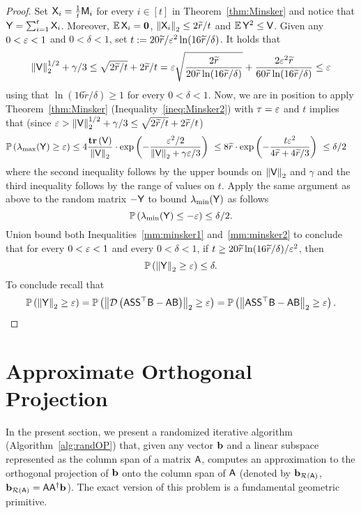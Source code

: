 \begin{proof}
Set ${\mathsf{X} }_i = \frac1{t} {\mathsf{M} }_i$ for every $i\in{[t]}$ in Theorem~\ref{thm:Minsker} and notice that ${\mathsf{Y} } = \sum_{i=1}^{t}{\mathsf{X} }_i$. Moreover, $\operatorname{\mathbb{E}} {\mathsf{X} }_i =\mathbf{0}$, $\left\|{\mathsf{X} }_i\right\|_2\leq 2\widetilde{r} / t$ and $\operatorname{\mathbb{E}} {\mathsf{Y} }^2 \leq {\ensuremath{\mathsf{V} }}$. Given any $0<\varepsilon < 1$ and $0<\delta <1$, set $t := 20 \widetilde{r} /\varepsilon^2 \ln( 16\widetilde{r}/\delta)$. It holds that
\[
\left\|{\mathsf{V} }\right\|_2^{1/2} + \gamma /3 \leq \sqrt{2\widetilde{r} /t} + 2\widetilde{r}/t  = \varepsilon \sqrt{\frac{2\widetilde{r}}{20\widetilde{r}\ln(16\widetilde{r}/\delta)}} + \frac{2\varepsilon^2 \widetilde{r}}{60\widetilde{r}\ln(16\widetilde{r}/\delta)} \leq \varepsilon
\]
using that $\ln(16\widetilde{r}/\delta) \geq 1$ for every $0<\delta < 1$. Now, we are in position to apply Theorem~\ref{thm:Minsker} (Inequality~\ref{ineq:Minsker2}) with $\tau=\varepsilon$ and $t$ implies that (since $\varepsilon > \left\|{\mathsf{V} }\right\|_2^{1/2} + \gamma /3 \leq \sqrt{2\widetilde{r} /t} + 2\widetilde{r}/t$)
\begin{align}
\mathbb{P}\left( \lambda_{\max}({\mathsf{Y} }) \geq \varepsilon \right) &\leq 4 \frac{\operatorname{\textbf{tr}}\left({\mathsf{V} }\right)}{\left\|{\mathsf{V} }\right\|_2} \cdot\hbox{\textrm exp}\left(-\frac{\varepsilon^2/2}{\left\|{\mathsf{V} }\right\|_2 + \gamma \varepsilon/3}\right)
										 \ \leq 8 \widetilde{r} \cdot\hbox{\textrm exp}\left(-\frac{t\varepsilon^2}{ 4\widetilde{r}  + 4\widetilde{r}/3}\right)
										 \ \leq \delta /2 \label{mm:minsker1}
\end{align}
where the second inequality follows by the upper bounds on $\left\|{\mathsf{V} }\right\|_2$ and $\gamma$ and the third inequality follows by the range of values on $t$. Apply the same argument as above to the random matrix $-{\mathsf{Y} }$ to bound $\lambda_{\min}({\mathsf{Y} })$ as follows
\begin{equation}\label{mm:minsker2}
\mathbb{P}\left( \lambda_{\min}({\mathsf{Y} }) \leq  - \varepsilon \right) \leq \delta / 2.
\end{equation}
Union bound both Inequalities~\eqref{mm:minsker1} and~\eqref{mm:minsker2} to conclude that for every $0<\varepsilon <1$ and every $0<\delta<1$, if $t\geq 20 \widetilde{r}\ln(16\widetilde{r}/\delta)/\varepsilon^2 $, then
\[\mathbb{P}\left( \left\|{\mathsf{Y} }\right\|_2\geq \varepsilon\right) \leq \delta.\]
To conclude recall that
\[\mathbb{P}\left(\left\|{\mathsf{Y} }\right\|_2 \geq \varepsilon \right) = \mathbb{P}\left( \left\|\mathcal{D}\left({\mathsf{A} }{\mathsf{S} }{\mathsf{S} }^\top {\ensuremath{\mathsf{B} }}- {\mathsf{A} }{\mathsf{B} } \right)\right\|_2 \geq \varepsilon \right) = \mathbb{P}\left(\left\| {\mathsf{A} }{\mathsf{S} }{\mathsf{S} }^\top {\ensuremath{\mathsf{B} }} - {\mathsf{A} } {\mathsf{B} }\right\|_2\geq \varepsilon \right).\]
\end{proof}
%
%
%
\section{Approximate Orthogonal Projection}
%
In the present section, we present a randomized iterative algorithm (Algorithm~\ref{alg:randOP}) that, given any vector ${\mathbf b}$ and a linear subspace represented as the column span of a matrix ${\mathsf{A} }$, computes an approximation to the orthogonal projection of ${\mathbf b}$ onto the column span of ${\mathsf{A} }$ (denoted by ${{\mathbf b}_{\mathcal{R}({\mathsf{A} }) } }$, ${{\mathbf b}_{\mathcal{R}({\mathsf{A} }) } }={\mathsf{A} }{{\mathsf{A} }}^\dagger{\mathbf b}$). The exact version of this problem is a fundamental geometric primitive.
%


